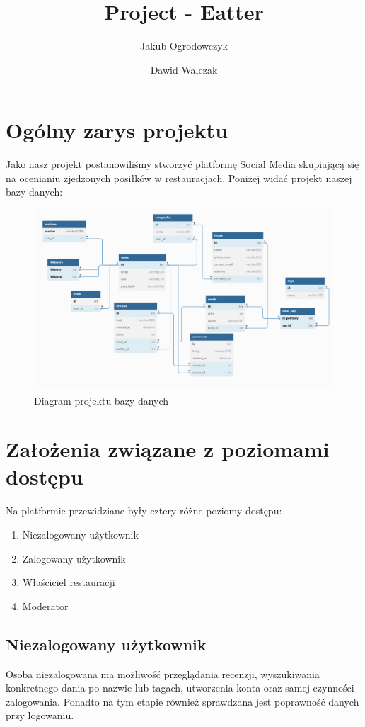 \documentclass{report}
\begin{document}
\title{Project - Eatter}
\author{Jakub Ogrodowczyk}
\author{Dawid Walczak}

\section*{Ogólny zarys projektu}
Jako nasz projekt postanowiliśmy stworzyć platformę Social Media
skupiającą się na ocenianiu zjedzonych posiłków w restauracjach.
Poniżej widać projekt naszej bazy danych:

\begin{figure}[h]
\includegraphics[width=\textwidth]{./diagram.png}
\caption[Example .]{Diagram projektu bazy danych}
\end{figure}

\section*{Założenia związane z poziomami dostępu}
Na platformie przewidziane były cztery różne poziomy dostępu:
\begin{enumerate}
    \item Niezalogowany użytkownik
    \item Zalogowany użytkownik
    \item Właściciel restauracji
    \item Moderator
\end{enumerate}
\subsection*{Niezalogowany użytkownik}
Osoba niezalogowana ma możliwość przeglądania recenzji, wyszukiwania
konkretnego dania po nazwie lub tagach, utworzenia konta
oraz samej czynności zalogowania.
Ponadto na tym etapie również sprawdzana jest poprawność danych przy
logowaniu.
\end{document}
